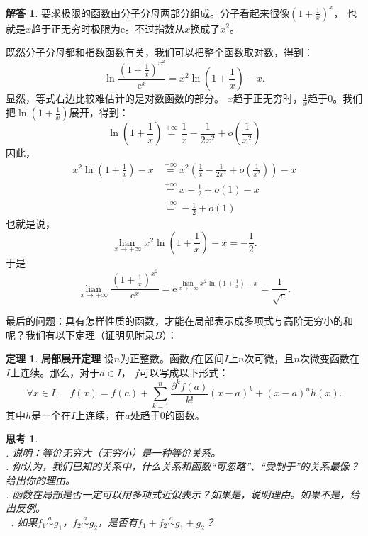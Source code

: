 \documentclass[12pt,UTF8]{ctexbook}
\newcommand{\lian}[1]{
    \underset{#1}{\operatorname{lian}\,}
}
\newcommand{\oveq}[1]{\overset{#1}{=}}
\newcommand{\olim}[1]{\mathit{o}\left(#1\right)}  %
\newcommand{\eqlim}[1]{\overset{#1}{\sim}}  %
\theoremstyle{definition}
\newtheorem{tm}{定理}[section]
\newtheorem*{so}{解答}
\theoremstyle{plain}
\newtheorem{sk}{思考}[section]
\begin{document}
\begin{so}
    要求极限的函数由分子分母两部分组成。分子看起来很像$\left(1 + \frac{1}{x}\right)^{x}$，
    也就是$x$趋于正无穷时极限为$\mathrm{e}$。不过指数从$x$换成了$x^2$。

    既然分子分母都和指数函数有关，我们可以把整个函数取对数，得到：
    $$ \ln{\frac{\left(1 + \frac{1}{x}\right)^{x^2}}{\mathrm{e}^x}} = x^2 \ln{\left(1 + \frac{1}{x}\right)} - x.$$
    显然，等式右边比较难估计的是对数函数的部分。
    $x$趋于正无穷时，$\frac{1}{x}$趋于$0$。我们把$\ln{\left(1 + \frac{1}{x}\right)}$展开，得到：
    $$ \ln{\left(1 + \frac{1}{x}\right)} \oveq{+\infty} \frac{1}{x} - \frac{1}{2x^2} + \olim{\frac{1}{x^2}}$$
    因此，
    \begin{align*}
        x^2 \ln{\left(1 + \frac{1}{x}\right)} - x &\oveq{+\infty} x^2 \left(\frac{1}{x} - \frac{1}{2x^2} + \olim{\frac{1}{x^2}}\right) - x  \\
        &\oveq{+\infty} x -\frac{1}{2} + \olim{1} - x  \\
        &\oveq{+\infty} -\frac{1}{2} + \olim{1} 
    \end{align*}
    也就是说，
    $$ \lian{x\to +\infty} x^2 \ln{\left(1 + \frac{1}{x}\right)} - x = -\frac{1}{2}. $$
    于是
    $$ \lian{x\to +\infty} \frac{\left(1 + \frac{1}{x}\right)^{x^2}}{\mathrm{e}^x} = \mathrm{e}^{\lian{x\to +\infty}  x^2 \ln{\left(1 + \frac{1}{x}\right)} - x} = \frac{1}{\sqrt{e}}. $$
\end{so}

最后的问题：具有怎样性质的函数，才能在局部表示成多项式与高阶无穷小的和呢？我们有以下定理（证明见附录$B$）：
\begin{tm}{\textbf{局部展开定理}}
    设$n$为正整数。函数$f$在区间$I$上$n$次可微，且$n$次微变函数在$I$上连续。那么，对于$a\in I$，
    $f$可以写成以下形式：
    $$ \forall x \in I , \quad f(x) = f(a) + \sum_{k=1}^n \frac{\partial^k f (a)}{k!}(x - a)^k + (x - a)^n h(x). $$
    其中$h$是一个在$I$上连续，在$a$处趋于$0$的函数。
\end{tm}

\begin{sk}
    \mbox{} \\
    . 说明：等价无穷大（无穷小）是一种等价关系。\\
    . 你认为，我们已知的关系中，什么关系和函数“可忽略”、“受制于”的关系最像？给出你的理由。\\
    . 函数在局部是否一定可以用多项式近似表示？如果是，说明理由。如果不是，给出反例。\\\
    . 如果$f_1 \eqlim{a} g_1$，$f_2\eqlim{a} g_2$，是否有$f_1 + f_2\eqlim{a} g_1 + g_2$？
\end{sk}
\end{document}
